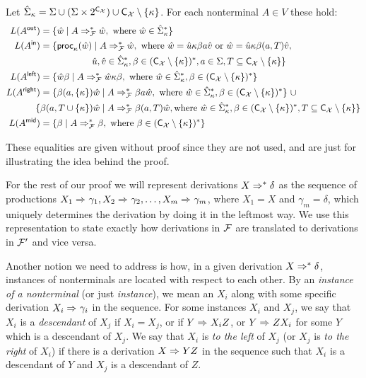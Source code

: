 %

Let $\hat{\Sigma}_{\kappa} = \Sigma \cup (\Sigma\times2^{\textsf{C}_{\mathcal{X}}}) \cup \textsf{C}_{\mathcal{X}}\setminus\{\kappa\}$. For each nonterminal $A\in V$ these hold:
\begin{align*}
	L(A^{\mathsf{out}}) &= \{\hat{w}\mid 
	A\Rightarrow_{\mathcal{F}}^* \hat{w}, 
	\ \text{where } \hat{w} \in  \hat{\Sigma}_{\kappa}^*\}\\
	L(A^{\mathsf{in}}) &= \{\mathsf{proc}_{\kappa}(\hat{w}) \mid 
	A\Rightarrow_{\mathcal{F}}^* \hat{w},
	\ \text{where } \hat{w} = \hat{u}\kappa\beta a \hat{v} \text{ or }\hat{w} = \hat{u}\kappa\beta (a, T) \hat{v},\\ 
	&\ \ \ \ \ \ \ \ \ \ \ \ \ \ \ \ \  \hat{u}, \hat{v} \in \hat{\Sigma}_{\kappa}^*, \beta\in (\textsf{C}_{\mathcal{X}}\setminus\{\kappa\})^*, a\in\Sigma, T\subseteq\textsf{C}_{\mathcal{X}}\setminus\{\kappa\}\}\\
	L(A^{\mathsf{left}}) &= \{\hat{w}\beta \mid 
	A\Rightarrow_{\mathcal{F}}^* \hat{w}\kappa\beta,
	\ \text{where } \hat{w}\in\hat{\Sigma}_{\kappa}^*, \beta\in(\textsf{C}_{\mathcal{X}}\setminus\{\kappa\})^*\}\\
	L(A^{\mathsf{right}}) &= \{\beta(a, \{\kappa\})\hat{w} \mid 
	A\Rightarrow_{\mathcal{F}}^* \beta a \hat{w},
	\ \text{where } \hat{w}\in \hat{\Sigma}_\kappa^*, \beta\in(\textsf{C}_{\mathcal{X}}\setminus\{\kappa\})^*
	\} \ \cup\\ 
	& \!\!\!\{\beta(a, T\cup \{\kappa\})\hat{w} \mid 
	A\Rightarrow_{\mathcal{F}}^* \beta (a,T) \hat{w},
	\text{where }\hat{w}\in\hat{\Sigma}_\kappa^*, \beta\in(\textsf{C}_{\mathcal{X}}\setminus\{\kappa\})^*, T\subseteq\textsf{C}_{\mathcal{X}}\setminus\{\kappa\}\}\\
	L(A^{\mathsf{mid}}) &= \{\beta\mid A \Rightarrow_{\mathcal{F}}^*\beta,
	\ \text{where }\beta\in(\textsf{C}_{\mathcal{X}}\setminus\{\kappa\})^*\}
\end{align*}

These equalities are given without proof since they are not used, and are just for illustrating the idea behind the proof.

For the rest of our proof we will represent derivations $X\Rightarrow_{}^* \delta$ as the sequence of productions $X_1\Rightarrow_{}\gamma_1, X_2\Rightarrow_{}\gamma_2, \ldots,X_m\Rightarrow_{}\gamma_m$, where $X_1 = X$ and $\gamma_m = \delta$, which uniquely determines the derivation by doing it in the leftmost way. We use this representation to state exactly how derivations in $\mathcal{F}$ are translated to derivations in $\mathcal{F}'$ and vice versa.

Another notion we need to address is how, in a given derivation $X\Rightarrow_{}^* \delta$, instances of nonterminals are located with respect to each other. By an \emph{instance of a nonterminal} (or just \emph{instance}), we mean an $X_i$ along with some specific derivation $X_i\Rightarrow_{} \gamma_i$ in the sequence. For some instances $X_i$ and $X_j$, we say that $X_i$ is a \emph{descendant} of $X_j$ if $X_i = X_j$, or if $Y \Rightarrow_{} X_i Z$, or $Y\Rightarrow_{} Z X_i$ for some $Y$ which is a descendant of $X_j$. We say that $X_i$ is \emph{to the left} of $X_j$ (or $X_j$ is \emph{to the right} of $X_i$) if there is a derivation $X\Rightarrow_{} Y Z$ in the sequence such that $X_i$ is a descendant of $Y$ and $X_j$ is a descendant of $Z$. 

